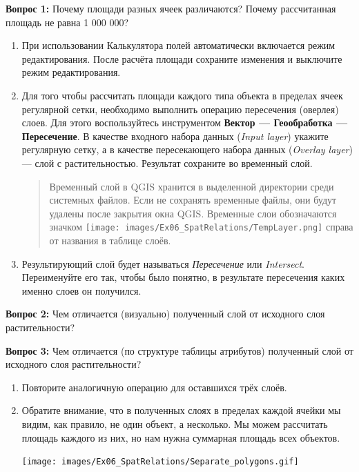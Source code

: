 \documentclass[
  12pt,
]{book}
\begin{document}
\textbf{Вопрос 1:} Почему площади разных ячеек различаются? Почему рассчитанная площадь не равна 1 000 000?

\begin{enumerate}
\def\labelenumi{\arabic{enumi}.}
\setcounter{enumi}{3}
\item
  При использовании Калькулятора полей автоматически включается режим редактирования. После расчёта площади сохраните изменения и выключите режим редактирования.
\item
  Для того чтобы рассчитать площади каждого типа объекта в пределах ячеек регулярной сетки, необходимо выполнить операцию пересечения (оверлея) слоев. Для этого воспользуйтесь инструментом \textbf{Вектор --- Геообработка --- Пересечение}. В качестве входного набора данных (\emph{Input layer}) укажите регулярную сетку, а в качестве пересекающего набора данных (\emph{Overlay layer}) --- слой с растительностью. Результат сохраните во временный слой.

  \begin{quote}
  Временный слой в QGIS хранится в выделенной директории среди системных файлов. Если не сохранять временные файлы, они будут удалены после закрытия окна QGIS. Временные слои обозначаются значком \texttt{[image: images/Ex06\_SpatRelations/TempLayer.png]} справа от названия в таблице слоёв.
  \end{quote}
\item
  Результирующий слой будет называться \emph{Пересечение} или \emph{Intersect}. Переименуйте его так, чтобы было понятно, в результате пересечения каких именно слоев он получился.
\end{enumerate}

\textbf{Вопрос 2:} Чем отличается (визуально) полученный слой от исходного слоя растительности?

\textbf{Вопрос 3:} Чем отличается (по структуре таблицы атрибутов) полученный слой от исходного слоя растительности?

\begin{enumerate}
\def\labelenumi{\arabic{enumi}.}
\setcounter{enumi}{2}
\item
  Повторите аналогичную операцию для оставшихся трёх слоёв.
\item
  Обратите внимание, что в полученных слоях в пределах каждой ячейки мы видим, как правило, не один объект, а несколько. Мы можем рассчитать площадь каждого из них, но нам нужна суммарная площадь всех объектов.

  \texttt{[image: images/Ex06\_SpatRelations/Separate\_polygons.gif]}
\end{enumerate}
\end{document}
